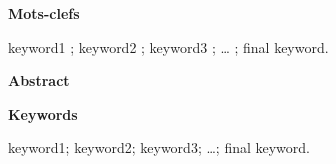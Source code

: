 \documentclass[10pt]{article}
\newenvironment{cover}{%
  \fontfamily{phv}\selectfont %
  \pagestyle{empty} %
}{%
  \addtocounter{page}{-1}
  \cleardoublepage
}
\begin{document}
\begin{cover}
\begin{multicols}{2}
    \noindent
    \textbf{Mots-clefs}
    \smallskip

    \noindent %
    keyword1 ; keyword2 ; keyword3 ; \dots{} ; final keyword.

    \columnbreak

    \noindent
    \textbf{\large Abstract}
    \medskip
    
    \noindent %
    \lipsum[4-6]
    \bigskip

    \noindent
    \textbf{Keywords}
    \smallskip

    \noindent %
    keyword1; keyword2; keyword3; \dots{}; final keyword.
    
  \end{multicols}
\end{cover}
\end{document}
